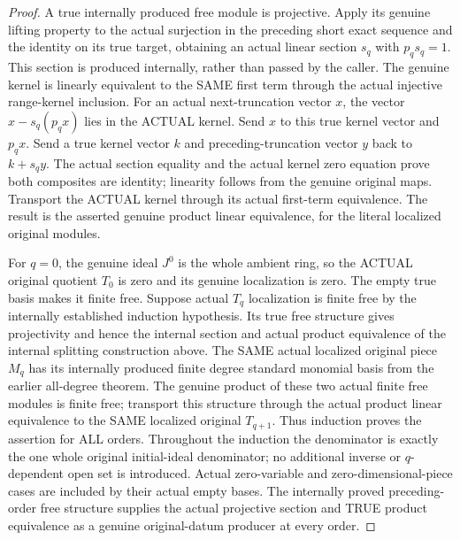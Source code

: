 \begin{proof}

A true internally produced free module is projective. Apply its genuine
lifting property to the actual surjection in the preceding short exact
sequence and the identity on its true target, obtaining an actual linear
section $s_q$ with $p_qs_q=1$. This section is produced internally, rather
than passed by the caller. The genuine kernel is linearly equivalent to
the SAME first term through the actual injective range-kernel inclusion.
For an actual next-truncation vector $x$, the vector
$x-s_q(p_qx)$ lies in the ACTUAL kernel. Send $x$ to this true kernel
vector and $p_qx$. Send a true kernel vector $k$ and preceding-truncation
vector $y$ back to $k+s_qy$. The actual section equality and the actual
kernel zero equation prove both composites are identity; linearity follows
from the genuine original maps. Transport the ACTUAL kernel through its
actual first-term equivalence. The result is the asserted genuine product
linear equivalence, for the literal localized original modules.

For $q=0$, the genuine ideal $J^0$ is the whole ambient ring, so the ACTUAL
original quotient $T_0$ is zero and its genuine localization is zero. The
empty true basis makes it finite free. Suppose actual $T_q$ localization
is finite free by the internally established induction hypothesis. Its
true free structure gives projectivity and hence the internal section
and actual product equivalence of the internal splitting construction above. The SAME actual
localized original piece $M_q$ has its internally produced finite degree
standard monomial basis from the earlier all-degree theorem. The genuine
product of these two actual finite free modules is finite free; transport
this structure through the actual product linear equivalence to the SAME
localized original $T_{q+1}$. Thus induction proves the assertion for ALL
orders. Throughout the induction the denominator is exactly the one whole
original initial-ideal denominator; no additional inverse or $q$-dependent
open set is introduced. Actual zero-variable and zero-dimensional-piece
cases are included by their actual empty bases. The internally proved
preceding-order free structure supplies the actual projective section and
TRUE product equivalence as a genuine original-datum producer at every order.
\end{proof}


